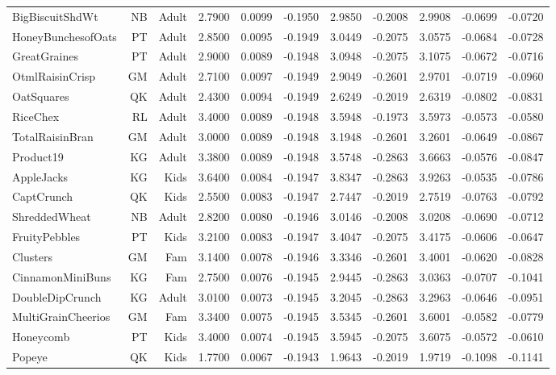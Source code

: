 \begin{longtable}{@{}lrrrrrrrrrr@{}}
BigBiscuitShdWt & NB & Adult & 2.7900 & 0.0099 & -0.1950 & 2.9850 & -0.2008 & 2.9908 & -0.0699 & -0.0720 \\
HoneyBunchesofOats & PT & Adult & 2.8500 & 0.0095 & -0.1949 & 3.0449 & -0.2075 & 3.0575 & -0.0684 & -0.0728 \\
GreatGraines & PT & Adult & 2.9000 & 0.0089 & -0.1948 & 3.0948 & -0.2075 & 3.1075 & -0.0672 & -0.0716 \\
OtmlRaisinCrisp & GM & Adult & 2.7100 & 0.0097 & -0.1949 & 2.9049 & -0.2601 & 2.9701 & -0.0719 & -0.0960 \\
OatSquares & QK & Adult & 2.4300 & 0.0094 & -0.1949 & 2.6249 & -0.2019 & 2.6319 & -0.0802 & -0.0831 \\
RiceChex & RL & Adult & 3.4000 & 0.0089 & -0.1948 & 3.5948 & -0.1973 & 3.5973 & -0.0573 & -0.0580 \\
TotalRaisinBran & GM & Adult & 3.0000 & 0.0089 & -0.1948 & 3.1948 & -0.2601 & 3.2601 & -0.0649 & -0.0867 \\
Product19 & KG & Adult & 3.3800 & 0.0089 & -0.1948 & 3.5748 & -0.2863 & 3.6663 & -0.0576 & -0.0847 \\
AppleJacks & KG & Kids & 3.6400 & 0.0084 & -0.1947 & 3.8347 & -0.2863 & 3.9263 & -0.0535 & -0.0786 \\
CaptCrunch & QK & Kids & 2.5500 & 0.0083 & -0.1947 & 2.7447 & -0.2019 & 2.7519 & -0.0763 & -0.0792 \\
ShreddedWheat & NB & Adult & 2.8200 & 0.0080 & -0.1946 & 3.0146 & -0.2008 & 3.0208 & -0.0690 & -0.0712 \\
FruityPebbles & PT & Kids & 3.2100 & 0.0083 & -0.1947 & 3.4047 & -0.2075 & 3.4175 & -0.0606 & -0.0647 \\
Clusters & GM & Fam & 3.1400 & 0.0078 & -0.1946 & 3.3346 & -0.2601 & 3.4001 & -0.0620 & -0.0828 \\
CinnamonMiniBuns & KG & Fam & 2.7500 & 0.0076 & -0.1945 & 2.9445 & -0.2863 & 3.0363 & -0.0707 & -0.1041 \\
DoubleDipCrunch & KG & Adult & 3.0100 & 0.0073 & -0.1945 & 3.2045 & -0.2863 & 3.2963 & -0.0646 & -0.0951 \\
MultiGrainCheerios & GM & Fam & 3.3400 & 0.0075 & -0.1945 & 3.5345 & -0.2601 & 3.6001 & -0.0582 & -0.0779 \\
Honeycomb & PT & Kids & 3.4000 & 0.0074 & -0.1945 & 3.5945 & -0.2075 & 3.6075 & -0.0572 & -0.0610 \\
Popeye & QK & Kids & 1.7700 & 0.0067 & -0.1943 & 1.9643 & -0.2019 & 1.9719 & -0.1098 & -0.1141 \\
\bottomrule
\end{longtable}
\endgroup